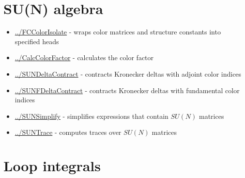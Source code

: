 \documentclass[../FeynCalcManual.tex]{subfiles}
\begin{document}
\hypertarget{su(n) algebra}{
\section{SU(N) algebra}\label{su(n) algebra}}

\begin{itemize}
\tightlist
\item
  \hyperlink{../fccolorisolate}{../FCColorIsolate} - wraps color
  matrices and structure constants into specified heads
\item
  \hyperlink{../calccolorfactor}{../CalcColorFactor} - calculates the
  color factor
\item
  \hyperlink{../sundeltacontract}{../SUNDeltaContract} - contracts
  Kronecker deltas with adjoint color indices
\item
  \hyperlink{../sunfdeltacontract}{../SUNFDeltaContract} - contracts
  Kronecker deltas with fundamental color indices
\item
  \hyperlink{../sunsimplify}{../SUNSimplify} - simplifies expressions
  that contain \(SU(N)\) matrices
\item
  \hyperlink{../suntrace}{../SUNTrace} - computes traces over \(SU(N)\)
  matrices
\end{itemize}

\hypertarget{loop integrals}{
\section{Loop integrals}\label{loop integrals}}
\end{document}
